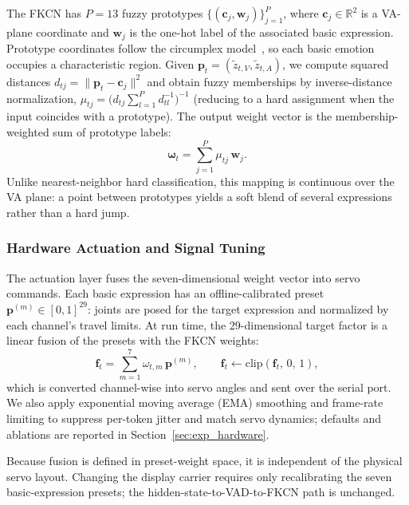 \documentclass[letterpaper, 10 pt, conference]{ieeeconf/ieeeconf}
\begin{document}
The FKCN has $P = 13$ fuzzy prototypes $\{(\mathbf{c}_j, \mathbf{w}_j)\}_{j=1}^{P}$, where $\mathbf{c}_j \in \mathbb{R}^2$ is a VA-plane coordinate and $\mathbf{w}_j$ is the one-hot label of the associated basic expression. Prototype coordinates follow the circumplex model~\cite{russell1980circumplex}, so each basic emotion occupies a characteristic region.
Given $\mathbf{p}_t = (\tilde{z}_{t,V}, \tilde{z}_{t,A})$, we compute squared distances $d_{tj} = \|\mathbf{p}_t - \mathbf{c}_j\|^2$ and obtain fuzzy memberships by inverse-distance normalization,
$\mu_{tj} = \bigl(d_{tj}\sum_{l=1}^{P} d_{tl}^{-1}\bigr)^{-1}$ (reducing to a hard assignment when the input coincides with a prototype).
The output weight vector is the membership-weighted sum of prototype labels:
\begin{equation}
    \boldsymbol{\omega}_t = \sum_{j=1}^{P} \mu_{tj}\, \mathbf{w}_j .
    \label{eq:fkcn}
\end{equation}
Unlike nearest-neighbor hard classification, this mapping is continuous over the VA plane: a point between prototypes yields a soft blend of several expressions rather than a hard jump.

\subsubsection{Hardware Actuation and Signal Tuning}
The actuation layer fuses the seven-dimensional weight vector into servo commands.
Each basic expression has an offline-calibrated preset $\mathbf{p}^{(m)} \in [0,1]^{29}$: joints are posed for the target expression and normalized by each channel's travel limits.
At run time, the 29-dimensional target factor is a linear fusion of the presets with the FKCN weights:
\begin{equation}
    \mathbf{f}_t = \sum_{m=1}^{7} \omega_{t,m}\, \mathbf{p}^{(m)}, \qquad \mathbf{f}_t \leftarrow \mathrm{clip}(\mathbf{f}_t,\, 0,\, 1),
    \label{eq:fusion}
\end{equation}
which is converted channel-wise into servo angles and sent over the serial port. We also apply exponential moving average (EMA) smoothing and frame-rate limiting to suppress per-token jitter and match servo dynamics; defaults and ablations are reported in Section~\ref{sec:exp_hardware}.

Because fusion is defined in preset-weight space, it is independent of the physical servo layout. Changing the display carrier requires only recalibrating the seven basic-expression presets; the hidden-state-to-VAD-to-FKCN path is unchanged.
\end{document}
